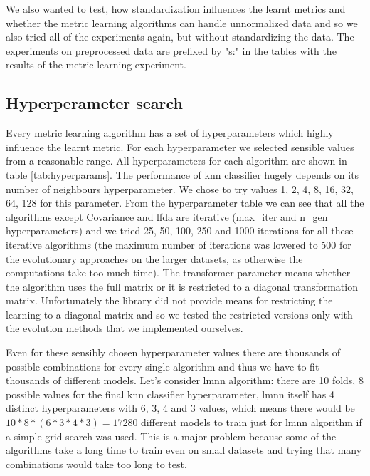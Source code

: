 \documentclass[12pt,a4paper]{report}
\begin{document}
We also wanted to test, how standardization influences the learnt metrics and whether the metric learning algorithms can handle unnormalized data and so we also tried all of the experiments again, but without standardizing the data. The experiments on preprocessed data are prefixed by "s:" in the tables with the results of the metric learning experiment.

\subsection{Hyperperameter search} \label{chap:exp:hypsearch}

Every metric learning algorithm has a set of hyperparameters which highly influence the learnt metric. For each hyperparameter we selected sensible values from a reasonable range. All hyperparameters for each algorithm are shown in table \ref{tab:hyperparams}. The performance of \ac{knn} classifier hugely depends on its number of neighbours hyperparameter. We chose to try values 1, 2, 4, 8, 16, 32, 64, 128 for this parameter. From the hyperparameter table we can see that all the algorithms except Covariance and \ac{lfda} are iterative (max\_iter and n\_gen hyperparameters) and we tried 25, 50, 100, 250 and 1000 iterations for all these iterative algorithms (the maximum number of iterations was lowered to 500 for the evolutionary approaches on the larger datasets, as otherwise the computations take too much time). The transformer parameter means whether the algorithm uses the full matrix or it is restricted to a diagonal transformation matrix. Unfortunately the library did not provide means for restricting the learning to a diagonal matrix and so we tested the restricted versions only with the evolution methods that we implemented ourselves. %



Even for these sensibly chosen hyperparameter values there are thousands of possible combinations for every single algorithm and thus we have to fit thousands of different models. Let's consider \ac{lmnn} algorithm: there are 10 folds, 8 possible values for the final \ac{knn} classifier hyperparameter, \ac{lmnn} itself has 4 distinct hyperparameters with 6, 3, 4 and 3 values, which means there would be $10*8*(6*3*4*3)=17280$ different models to train just for \ac{lmnn} algorithm if a simple grid search was used. This is a major problem because some of the algorithms take a long time to train even on small datasets and trying that many combinations would take too long to test.
\end{document}

